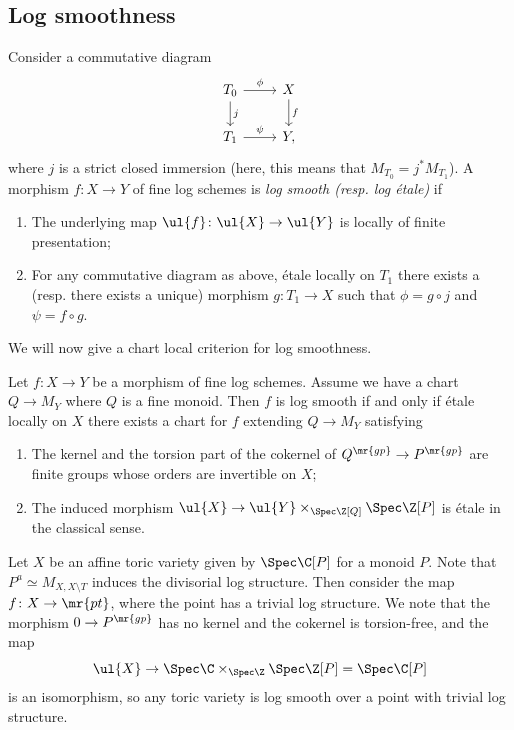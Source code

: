 \subsection{Log smoothness}%
\label{sub:Log smoothness}

\begin{defn}
    Consider a commutative diagram
    \begin{equation*}
    \begin{tikzcd}
        T_0 \ar{r}{\phi} \ar{d}{j} & X \ar{d}{f} \\
        T_1 \ar{r}{\psi} & Y,
    \end{tikzcd}
    \end{equation*}
    where \(j\) is a strict closed immersion (here, this means that \(M_{T_0} = j^* M_{T_1}\)). A morphism \(f \colon X \to Y\) of fine log schemes is \textit{log smooth (resp. log \'etale)} if
    \begin{enumerate}
        \item The underlying map \(\ul{f} \colon \ul{X} \to \ul{Y}\) is locally of finite presentation;
        \item For any commutative diagram as above, \'etale locally on \(T_1\) there exists a (resp. there exists a unique) morphism \(g \colon T_1 \to X\) such that \(\phi = g \circ j\) and \(\psi = f \circ g\).
    \end{enumerate}
\end{defn}

We will now give a chart local criterion for log smoothness.

\begin{thm}
    Let \(f \colon X \to Y\) be a morphism of fine log schemes. Assume we have a chart \(Q \to M_Y\) where \(Q\) is a fine monoid. Then \(f\) is log smooth if and only if \'etale locally on \(X\) there exists a chart for \(f\) extending \(Q \to M_Y\) satisfying
    \begin{enumerate}
        \item The kernel and the torsion part of the cokernel of \(Q^{\mr{gp}} \to P^{\mr{gp}}\) are finite groups whose orders are invertible on \(X\);
        \item The induced morphism \(\ul{X} \to \ul{Y} \times_{\Spec \Z[Q]} \Spec \Z[P]\) is \'etale in the classical sense.
    \end{enumerate}
\end{thm}

\begin{exm}
    Let \(X\) be an affine toric variety given by \(\Spec \C[P]\) for a monoid \(P\). Note that \(P^a \simeq M_{X, X \setminus T}\) induces the divisorial log structure. Then consider the map \(f \colon X \to \mr{pt}\), where the point has a trivial log structure. We note that the morphism \(0 \to P^{\mr{gp}}\) has no kernel and the cokernel is torsion-free, and the map
    \[ \ul{X} \to \Spec \C \times_{\Spec \Z} \Spec \Z[P] = \Spec \C[P] \]
    is an isomorphism, so any toric variety is log smooth over a point with trivial log structure.
\end{exm}

